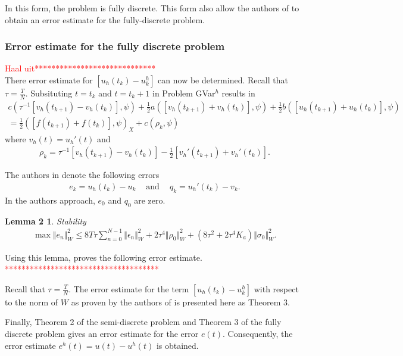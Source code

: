 \documentclass[../../main.tex]{subfiles}
\begin{document}
In this form, the problem is fully discrete. This form also allow the authors of \cite{BV13} to obtain an error estimate for the fully-discrete problem.

\subsubsection{Error estimate for the fully discrete problem}

\textcolor{red}{Haal uit*****************************}\\
There error estimate for $[u_h(t_k) - u^h_k]$ can now be determined. Recall that $\tau = \frac{T}{N}$. Subsituting $t = t_k$ and $t = t_k+1$ in Problem GVar$^h$ results in
\begin{eqnarray*}
	c( \tau^{-1}[v_{h}(t_{k+1})-v_{h}(t_{k})], \psi)+\frac{1}{2}a([v_{h}(t_{k+1})+v_{h}(t_{k})], \psi)+\frac{1}{2}b([u_{h}(t_{k+1})+u_{h}(t_{k})], \psi) \\
	=\frac{1}{2}([f(t_{k+1})+f(t_{k})], \psi)_{X}+c(\rho_{k}, \psi)
\end{eqnarray*}
where $v_{h}(t)=u_{h}'(t)$ and
\begin{eqnarray*}
	\rho_{k}=\tau^{-1}[v_{h}(t_{k+1})-v_{h}(t_{k})]-\frac{1}{2}[v_{h}'(t_{k+1})+v_{h}'(t_{k})].
\end{eqnarray*}

The authors in \cite{BV13} denote the following errors
\begin{eqnarray*}
	e_{k}=u_{h}(t_{k})-u_{k} \ \ \ \ \textrm{ and } \ \ \ \ q_{k}=u_{h}'(t_{k})-v_{k}.
\end{eqnarray*} In the authors approach, $e_0$ and $q_0$ are zero.

\newtheorem*{DC_Lem3}{Lemma 2}
\begin{DC_Lem3}
	Stability
	\begin{eqnarray*}
		\max\Vert e_{n}\Vert_{W}^{2}\leq 8T\tau\sum_{n=0}^{N-1}\Vert\epsilon_{n}\Vert_{W}^{2}+2\tau^{4}\Vert\rho_{0}\Vert_{W}^{2}+(8\tau^{2}+2\tau^{4}K_{a})\Vert\sigma_{0}\Vert_{W}^{2}.
	\end{eqnarray*}
\end{DC_Lem3}

Using this lemma, \cite{BV13} proves the following error estimate.\\
\textcolor{red}{*************************************}

Recall that $\displaystyle \tau = \frac{T}{N}$. The error estimate for the term $[u_h(t_k) - u^h_k]$ with respect to the norm of $W$ as proven by the authors of \cite{BV13} is presented here as Theorem 3.



Finally, Theorem 2 of the semi-discrete problem and Theorem 3 of the fully discrete problem gives an error estimate for the error $e(t)$. Consequently, the error estimate $e^h(t) = u(t) - u^h(t)$ is obtained.
		
		
\end{document}
